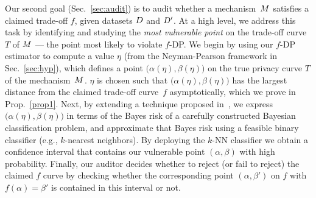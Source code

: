 

Our second goal (Sec.~\ref{sec:audit}) is to audit whether a mechanism~$M$ satisfies a claimed trade-off $f$, given datasets $D$ and $D'$. At a high level, we address this task by identifying and studying the \emph{most vulnerable point} on the trade-off curve $T$ of $M$ --- the point most likely to violate $f$-DP. We begin by using our $f$-DP estimator to compute a value $\eta$ (from the Neyman-Pearson framework in Sec.~\ref{sec:hyp}), which defines a point $\bigl(\alpha(\eta), \beta(\eta)\bigr)$ on the true privacy curve $T$ of the mechanism~$M$. $\eta$ is chosen such that $\bigl(\alpha(\eta), \beta(\eta)\bigr)$ has the largest distance from the claimed trade-off curve~$f$ asymptotically, which we prove in Prop.~\ref{prop1}.
Next, by extending a technique proposed in~\cite{Lu2024}, we express $\bigl(\alpha(\eta), \beta(\eta)\bigr)$ in terms of the Bayes risk of a carefully constructed Bayesian classification problem, and approximate that Bayes risk using a feasible binary classifier (e.g., $k$-nearest neighbors). By deploying the $k$-NN classifier we obtain a confidence interval that contains our vulnerable point $(\alpha,\beta)$ with high probability.
Finally, our auditor decides whether to reject (or fail to reject) the claimed $f$ curve by checking whether the corresponding point $(\alpha, \beta')$ on $f$ with $f(\alpha) = \beta'$ is contained in this interval or not.
